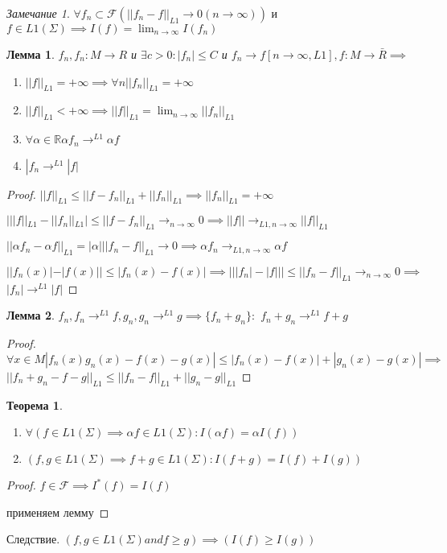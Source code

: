 \documentclass[a4paper, 12pt]{article}
\newtheorem{theorem}{Теорема}[section]
\newtheorem{lemma}{Лемма}[section]
\theoremstyle{definition}
\theoremstyle{remark}
\newtheorem*{remark}{Замечание}
\begin{document}
     \begin{remark}
     $\forall f_n \subset \mathcal{F}  (||f_n - f||_{L1}\to 0 (n\to\infty))$ и $f\in L1(\Sigma)\implies I(f) = \lim_{n\to\infty} I(f_n)$
     \end{remark}
     \begin{lemma}
          $f_n, f_n: M\to R$ и $\exists c>0 : |f_n|\leq C$ и $f_n\to f [n\to \infty , L1], f: M\to \bar{R}\implies$
          \begin{enumerate}
               \item $||f||_{L1} = +\infty \implies \forall n ||f_n||_{L1} = +\infty$
               \item $||f||_{L1}< +\infty\implies ||f||_{L1} = \lim_{n\to\infty}||f_n||_{L1}$
               \item $\forall \alpha \in \mathbb{R} \alpha f_n\to^{L1} \alpha f$
               \item $|f_n\to^{L1} |f|$
          \end{enumerate}
     \end{lemma}
     \begin{proof}
          $||f||_{L1}\leq ||f-f_n||_{L1} + ||f_n||_{L1}\implies ||f_n||_{L1} = +\infty$

          $|||f||_{L1} - ||f_n||_{L1}|\leq ||f-f_n||_{L1}\to_{n\to \infty} 0\implies ||f||\to_{L1, n\to\infty} ||f||_{L1}$

          $||\alpha f_n - \alpha f||_{L1} = |\alpha| ||f_n - f||_{L1}\to 0 \implies \alpha f_n \to_{L1, n\to \infty} \alpha f$

          $||f_n(x)| - |f(x)||\leq|f_n(x) - f(x)|\implies|||f_n| - |f|||\leq ||f_n - f||_{L1}\to_{n\to \infty} 0 \implies$
          $|f_n| \to^{L1} |f|$
     \end{proof}
     \begin{lemma}
          $f_n, f_n\to^{L1} f, g_n, g_n\to^{L1} g \implies \{f_n+g_n\}:$
          $f_n+g_n\to^{L1} f+g$
     \end{lemma}
     \begin{proof}
          $\forall x\in M |f_n(x) g_n(x) - f(x) - g(x)|\leq |f_n(x) - f(x)| + |g_n(x) - g(x)|\implies$
          $||f_n+g_n - f - g||_{L1}\leq ||f_n - f||_{L1} + ||g_n - g||_{L1}$
     \end{proof}
\begin{theorem}
     \begin{enumerate}
          \item $\forall (f\in L1(\Sigma)\implies \alpha f\in L1(\Sigma): I(\alpha f) = \alpha I(f))$
          \item $(f, g \in L1(\Sigma)\implies f+g\in L1(\Sigma): I(f+g) = I(f)+ I(g))$
     \end{enumerate}
\end{theorem}
\begin{proof}
     $f\in \mathcal{F} \implies I^*(f) = I(f)$

     применяем лемму
\end{proof}
Следствие.
     $(f, g\in L1(\Sigma)and f\geq g)\implies(I(f)\geq I(g))$
\end{document}
